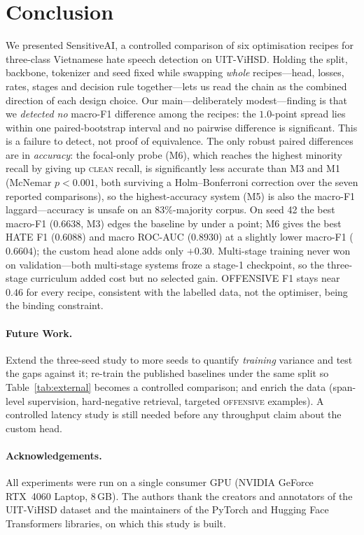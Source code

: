 \section{Conclusion}
\label{sec:conclusion}

We presented SensitiveAI, a controlled comparison of six optimisation recipes for
three-class Vietnamese hate speech detection on UIT-ViHSD.  Holding the split,
backbone, tokenizer and seed fixed while swapping \emph{whole}
recipes---head, losses, rates, stages and decision rule together---lets us read the
chain as the combined direction of each design choice.  Our main---deliberately
modest---finding is that we
\emph{detected no} macro-F1 difference among the recipes: the $1.0$-point spread
lies within one paired-bootstrap interval and no pairwise difference is
significant.  This is a failure to detect, not proof of equivalence.  The
only robust paired differences are in \emph{accuracy}: the focal-only probe (M6),
which reaches the highest minority recall by giving up \textsc{clean} recall, is
significantly less accurate than M3 and M1 (McNemar $p<0.001$, both surviving a
Holm--Bonferroni correction over the seven reported comparisons), so the
highest-accuracy system (M5) is also the
macro-F1 laggard---accuracy is unsafe on an 83\%-majority corpus.  On seed 42 the best macro-F1
($0.6638$, M3) edges the baseline by under a point; M6 gives the best HATE F1
($0.6088$) and macro ROC-AUC ($0.8930$) at a slightly lower macro-F1 ($0.6604$);
the custom head alone adds only $+0.30$.  Multi-stage training never won on
validation---both multi-stage systems froze a stage-1 checkpoint, so the
three-stage curriculum added cost but no selected gain.  OFFENSIVE F1 stays near
$0.46$ for every recipe, consistent with the labelled data, not the optimiser,
being the binding constraint.

\paragraph{Future Work.}
Extend the three-seed study to more seeds to quantify \emph{training} variance and
test the gaps against it; re-train the published baselines under the same split so
Table~\ref{tab:external} becomes a controlled comparison; and enrich the data
(span-level supervision, hard-negative retrieval, targeted
\textsc{offensive} examples).  A controlled latency study is still needed before
any throughput claim about the custom head.

\paragraph*{Acknowledgements.}
All experiments were run on a single consumer GPU (NVIDIA GeForce RTX~4060
Laptop, 8\,GB).  The authors thank the creators and annotators of the UIT-ViHSD
dataset and the maintainers of the PyTorch and Hugging Face Transformers
libraries, on which this study is built.

